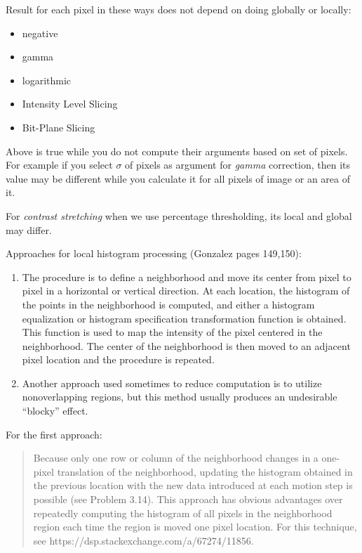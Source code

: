 
Result for each pixel in these ways does not depend on doing globally or
locally: 
\begin{itemize}
    \item negative
    \item gamma
    \item logarithmic
    \item Intensity Level Slicing
    \item Bit-Plane Slicing
\end{itemize}


Above is true while you do not compute their arguments based on set of pixels.
For example if you select $\sigma$ of pixels as argument for \emph{gamma} 
correction, then its value may be different while you calculate it for all 
pixels of image or an area of it.

For \emph{contrast stretching} when we use percentage thresholding, its local 
and global may differ.

Approaches for local histogram processing (Gonzalez pages 149,150):
\begin{enumerate}
    \item The procedure is to deﬁne a neighborhood and move its center from pixel to
    pixel in a horizontal or vertical direction. At each location, the histogram
    of the points in the neighborhood is computed, and either a histogram
    equalization or histogram speciﬁcation transformation function is obtained.
    This function is used to map the intensity of the pixel centered in the
    neighborhood. The center of the neighborhood is then moved to an adjacent
    pixel location and the procedure is repeated.

    \item Another approach used sometimes to reduce computation is to utilize 
    nonoverlapping regions, but this method usually produces an undesirable
    “blocky” effect.
\end{enumerate}

For the first approach:
    \begin{quotation}
        Because only one row or column of the neighborhood changes in a one-pixel
        translation of the neighborhood, updating the histogram obtained in the
        previous location with the new data introduced at each motion step is
        possible (see Problem 3.14). This approach has obvious advantages over
        repeatedly computing the histogram of all pixels in the neighborhood region
        each time the region is moved one pixel location. 
        For this technique, see https://dsp.stackexchange.com/a/67274/11856.
    \end{quotation}

